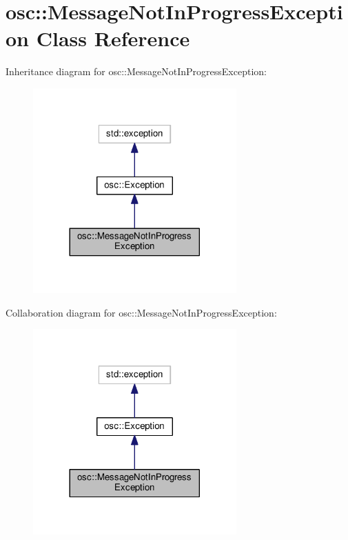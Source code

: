 \hypertarget{classosc_1_1_message_not_in_progress_exception}{}\section{osc\+:\+:Message\+Not\+In\+Progress\+Exception Class Reference}
\label{classosc_1_1_message_not_in_progress_exception}


Inheritance diagram for osc\+:\+:Message\+Not\+In\+Progress\+Exception\+:\nopagebreak
\begin{figure}[H]
\begin{center}
\leavevmode
\includegraphics[width=221pt]{classosc_1_1_message_not_in_progress_exception__inherit__graph}
\end{center}
\end{figure}


Collaboration diagram for osc\+:\+:Message\+Not\+In\+Progress\+Exception\+:\nopagebreak
\begin{figure}[H]
\begin{center}
\leavevmode
\includegraphics[width=221pt]{classosc_1_1_message_not_in_progress_exception__coll__graph}
\end{center}
\end{figure}
